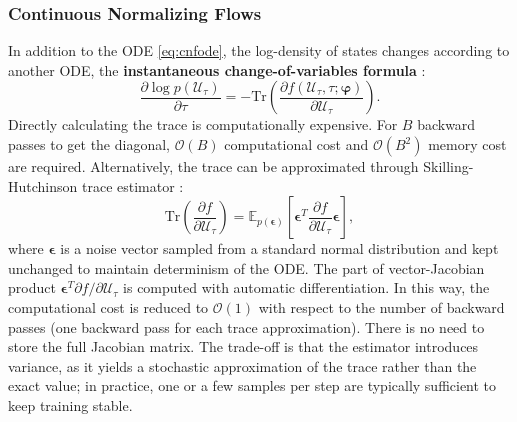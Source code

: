 \subsubsection{Continuous Normalizing Flows}
In addition to the ODE \ref{eq:cnfode}, the log-density of states changes according to another \ac{ODE}, the \textbf{instantaneous change-of-variables formula} \citep{chen2019node}:
\begin{equation}
    \label{eq:instchangeofvar}
    \frac{\partial\log p(\mathcal{U}_\tau)}{\partial \tau}=-\text{Tr}(\frac{\partial f(\mathcal{U}_\tau,\tau;\boldsymbol{\varphi})}{\partial\mathcal{U}_\tau}).
\end{equation}
Directly calculating the trace is computationally expensive. For $B$ backward passes to get the diagonal, $\mathcal{O}(B)$ computational cost and $\mathcal{O}(B^2)$ memory cost are required. Alternatively, the trace can be approximated through Skilling-Hutchinson trace estimator \citep{Skilling1989,Hutchinson01011990,adams2018adams}:
\begin{equation}
    \text{Tr}(\frac{\partial f}{\partial \mathcal{U}_\tau})=\mathbb{E}_{p(\boldsymbol{\epsilon})}[\boldsymbol{\epsilon}^T\frac{\partial f}{\partial \mathcal{U}_\tau}\boldsymbol{\epsilon}],
\end{equation}
where $\boldsymbol{\epsilon}$ is a noise vector sampled from a standard normal distribution and kept unchanged to maintain determinism of the \ac{ODE}. The part of vector-Jacobian product $\boldsymbol{\epsilon}^T\partial f/\partial \mathcal{U}_\tau$ is computed with automatic differentiation. In this way, the computational cost is reduced to $\mathcal{O}(1)$ with respect to the number of backward passes (one backward pass for each trace approximation). There is no need to store the full Jacobian matrix. The trade-off is that the estimator introduces variance, as it yields a stochastic approximation of the trace rather than the exact value; in practice, one or a few samples per step are typically sufficient to keep training stable.

